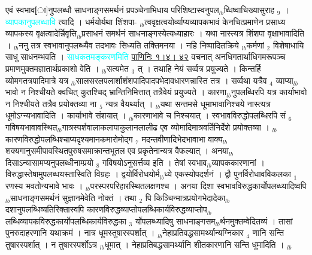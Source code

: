 \documentclass[article,12pt,a4paper]{memoir}%
\newcommand{\quotelemma}[1]{\textcolor{cyan}{#1}}
\newcounter{parCount}
\begin{document}
	  
	  \pstart \leavevmode%
	एवं स्वभाव[ा]नुपलब्धौ साधनाङ्गसमर्थनं प्रपञ्चेनाभिधाय परिशिष्टास्वनुपल{\tiny $_{lb}$}ब्धिष्वाचिख्यासुराह {\tiny $_{9}$} \leavevmode{} । \quotelemma{व्यापकानुपलब्धावि} \cite[6a8]{vn-msN} त्यादि । धर्मयोर्यथा शिंशपा- {\tiny $_{lb}$}त्ववृक्षत्वयोर्व्याप्यव्यापकभावं केनचित्प्रमाणेन प्रसाध्य व्यापकस्य वृक्षत्वादेर्न्निवृत्ति{\tiny $_{lb}$}प्रसाधनं समर्थनं साधनाङ्गस्येत्यध्याहारः । यथा नास्त्यत्र शिंशपा वृक्षाभावादिति । {\tiny $_{lb}$}ननु तत्र स्वभावानुपलब्ध्यैव तदभावः सिध्यति तक्तिमनया । नहि निष्पादितक्रिये {\tiny $_{lb}$}कर्मणां {\tiny $_{2}$} विशेषाधायि साधु साधनम्भवति । \quotelemma{साधकतमङ्करणमिति} \href{http://sarit.indology.info/?cref=P\%C4\%81.1.4}{पाणिनिः १।४। ४२} वचनात् अनधिगतार्थाधिगमरूपञ्च प्रमाणमुक्तमज्ञातार्थप्रकाशो वेति । {\tiny $_{lb}$}सत्यमेत {\tiny $_{3}$} त् । तथाहि नेयं सर्व्वत्र प्रयुज्यते । किन्तर्हि व्योमगतत्रपादिमात्रे यत्र {\tiny $_{lb}$}सालसरलपलार्शाशंशपादिपादपभेदावधारणन्नास्ति तत्र । सर्व्वथा यत्रैव {\tiny $_{4}$} व्याप्या{\tiny $_{lb}$} \leavevmode{} भावो न निश्चीयते क्वचित् कुतश्चिद् भ्रान्तिनिमित्तात् तत्रैवेयं प्रयुज्यते । कारणा{\tiny $_{lb}$}नुपलब्धिरपि यत्र कार्याभावो न निश्चीयते तत्रैव प्रयोक्तव्या ना {\tiny $_{5}$} न्यत्र वैयर्थ्यात् । {\tiny $_{lb}$}यथा सन्तमसे धूमाभावानिश्चये नास्त्यत्र धूमोऽग्न्यभावादिति । कार्याभावे संशयात् । {\tiny $_{lb}$}कारणाभावे च निश्चयात् । स्वभावविरुद्धोपलब्धिरपि सं {\tiny $_{6}$} गविषयभावावस्थित{\tiny $_{lb}$}गात्रस्पर्शवालाकलापाकुलानलालीढ एव व्योमादिमात्रवर्तिनिर्देशे प्रयोक्तव्या । {\tiny $_{lb}$}कारणविरुद्धोपलब्धिश्चाप्यदृश्यमानकमारोमोद्ग {\tiny $_{7}$} \leavevmode{}मदन्तवीणादिभेदभावाभा वाक्य{\tiny $_{lb}$}शक्यगानुसमीपावस्थितपुरुषसमाक्रान्तभूतल एव प्रकृतेनान्यत्र वैफल्यात् । अनया{\tiny $_{lb}$}दिसाऽन्यासामप्यनुपलब्धीनाम्प्रयो {\tiny $_{8}$} गविषयोऽनुसर्त्तव्य इति । तेषां स्वभाव{\tiny $_{lb}$}व्यापककारणानां । विरुद्धास्तेषामुपलब्धयस्तास्विति विग्रहः । द्वयोर्विरोधयोर्म{\tiny $_{lb}$}ध्ये एकस्योपदर्शनं । द्वौ पुनर्विरोधावविकलका {\tiny $_{1}$} रणस्य भवतोन्यभावे भावः । {\tiny $_{lb}$}परस्परपरिहारस्थितलक्षणश्च । अनया दिशा स्वभावविरुद्धकार्योपलब्ध्यादिष्वपि {\tiny $_{lb}$}साधनाङ्गसमर्थनं सुज्ञानमेवेति नोक्तं । तथा {\tiny $_{2}$} पि किञ्चिन्मात्रप्रयोगभेदादेका{\tiny $_{lb}$}दशानुपलब्धिव्यतिरिक्तास्वपि कारणविरुद्धव्याप्तोपलब्धिकार्यविरुद्धव्याप्तोप{\tiny $_{lb}$}लब्धिव्यापकविरुद्धकार्योपलब्धिकार्यविरुद्धका {\tiny $_{3}$} र्योपलब्ध्यादिषु साधनाङ्गसम{\tiny $_{lb}$}र्थनमुक्तम्वेदितव्यं । तासां पुनरुदाहरणानि यथाक्रमं । नात्र धूमस्तुषारस्पर्शात् । {\tiny $_{lb}$}नेहाप्रतिवद्धसामर्थ्यान्यग्निकार {\tiny $_{4}$} णानि सन्ति तुषारस्पर्शात् । न तुषारस्पर्शोऽत्र {\tiny $_{lb}$}धूमात् । नेहाप्रतिबद्धसामर्थ्यानि शीतकारणानि सन्ति धूमादिति ।
	{}
	\pend%
      {\tiny $_{lb}$}
	  \bigskip
	  \begingroup
	
\end{document}
